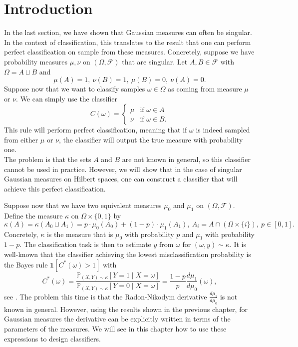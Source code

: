 \documentclass[10pt, a4paper]{report}
\newcommand{\Pp}[0]{\mathbb{P}}
\theoremstyle{definition}
\theoremstyle{remark}
\begin{document}
\section{Introduction}
In the last section, we have shown that Gaussian measures can often be singular. In the context of classification, this translates to the result that one can perform perfect classification on sample from these measures. Concretely, suppose we have probability measures $\mu,\nu$ on $(\Omega,\mathcal{F})$ that are singular. Let $A,B \in \mathcal{F}$ with $\Omega = A \sqcup B$ and
$$\mu(A)=1,\ \nu(B)=1,\ \mu(B)=0,\ \nu(A)=0.$$
Suppose now that we want to classify samples $\omega\in \Omega$ as coming from measure $\mu$ or $\nu$. We can simply use the classifier 
$$C(\omega) = 
\begin{cases}
	\mu & \text{if } \omega\in A\\
	\nu & \text{if } \omega\in B.
\end{cases}$$
This rule will perform perfect classification, meaning that if $\omega$ is indeed sampled from either $\mu$ or $\nu$, the classifier will output the true measure with probability one.\\
The problem is that the sets $A$ and $B$ are not known in general, so this classifier cannot be used in practice. However, we will show that in the case of singular Gaussian measures on Hilbert spaces, one can construct a classifier that will achieve this perfect classification.

Suppose now that we have two equivalent measures $\mu_0$ and $\mu_1$ on $(\Omega,\mathcal{F})$. Define the measure $\kappa$ on $\Omega\times \{0,1\}$ by 
$$\kappa(A) = \kappa\left(A_0 \sqcup A_1\right) = p\cdot \mu_0(A_0) + (1-p)\cdot\mu_1(A_1),\ A_i = A \cap (\Omega\times \{i\}), \ p\in [0,1].$$
Concretely, $\kappa$ is the measure that is $\mu_0$ with probability $p$ and $\mu_1$ with probability $1-p$. The classification task is then to estimate $y$ from $\omega$ for $(\omega,y)\sim \kappa$. It is well-known that the classifier achieving the lowest misclassification probability is the Bayes rule $\mathbf{1}[C^*(\omega)>1]$ with
\begin{equation}\label{bayesclass}
	C^*(\omega) = \frac{\Pp_{(X,Y)\sim \kappa}[Y=1\mid X=\omega]}{\Pp_{(X,Y)\sim \kappa}[Y=0\mid X=\omega]} =\frac{1-p}{p}\frac{d\mu_1}{d\mu_0}(\omega),
\end{equation}
see \cite[Theorem 2.1]{devroye}. The problem this time is that the Radon-Nikodym derivative $\frac{d\mu_1}{d\mu_0}$ is not known in general. However, using the results shown in the previous chapter, for Gaussian measures the derivative can be explicitly written in terms of the parameters of the measures. We will see in this chapter how to use these expressions to design classifiers.
\end{document}
